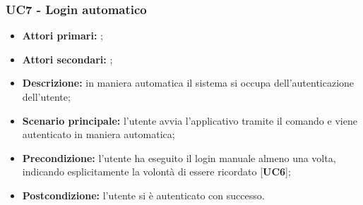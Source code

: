\subsubsection{UC7 - Login automatico}
\begin{itemize}
	\item \textbf{Attori primari:} \una{};
	\item \textbf{Attori secondari:} \re{};
	\item \textbf{Descrizione:} in maniera automatica il sistema si occupa dell’autenticazione dell’utente;
	\item \textbf{Scenario principale:} l’utente avvia l'applicativo tramite il comando \init{} e viene autenticato in maniera automatica; 
	\item \textbf{Precondizione:} l’utente ha eseguito il login manuale almeno una volta, indicando esplicitamente la volontà di essere ricordato [\textbf{UC6}];
	\item \textbf{Postcondizione:} l’utente si è autenticato con successo.
\end{itemize}